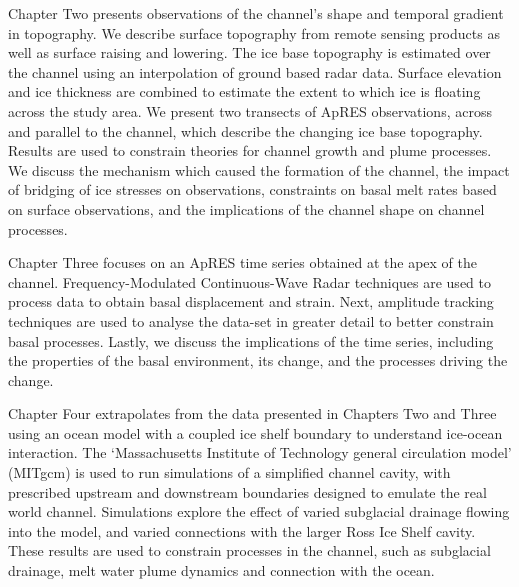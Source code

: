 Chapter Two presents observations of the channel's shape and temporal gradient in topography. We describe surface topography  from remote sensing products as well as surface raising and lowering. The ice base topography is estimated over the channel using an interpolation of ground based radar data. Surface elevation and ice thickness are combined to estimate the extent to which ice is floating across the study area.  We present two transects of ApRES observations, across and parallel to the channel, which describe the changing ice base topography.   Results are used to constrain theories for channel growth and plume processes. We discuss the mechanism which caused the formation of the channel, the impact of bridging of ice stresses on observations, constraints on basal melt rates based on surface observations, and the implications of the channel shape on channel processes. 



Chapter Three focuses on an ApRES time series obtained at the apex of the channel.  Frequency-Modulated Continuous-Wave Radar techniques are used to process data to obtain basal displacement and strain.  Next, amplitude tracking techniques are used to analyse the data-set in greater detail to better constrain basal processes. Lastly, we discuss the implications of the time series, including the properties of the basal environment, its change, and the processes driving the change.


Chapter Four extrapolates from the data presented in Chapters Two and Three using an ocean model with a coupled ice shelf boundary to understand ice-ocean interaction. The `Massachusetts Institute of Technology general circulation model' (MITgcm) is used to run simulations of a simplified channel cavity, with prescribed upstream and downstream boundaries designed to emulate the real world channel. Simulations explore the effect of varied subglacial drainage flowing into the model, and varied connections with the larger Ross Ice Shelf cavity. These results are  used to constrain processes in the channel, such as subglacial drainage, melt water plume dynamics and connection with the ocean.

